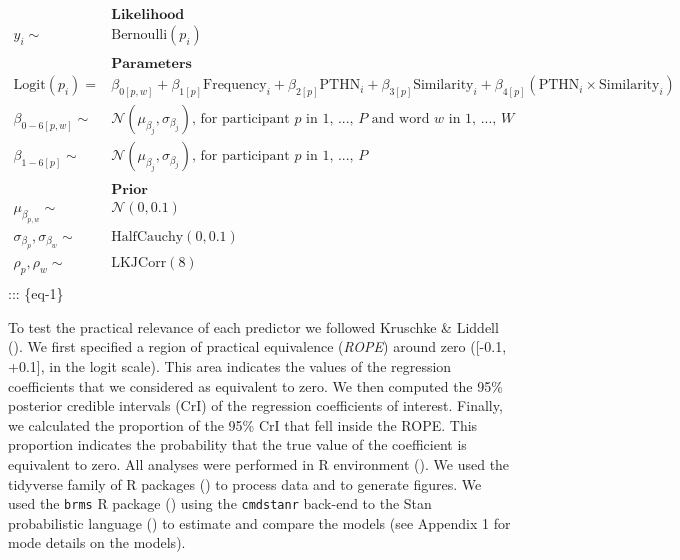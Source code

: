 \documentclass[
]{article}
\begin{document}
\[
\begin{aligned}
&\textbf{Likelihood}  \\
y_{i} \sim & \text{Bernoulli}(p_{i}) \\ \\
&\textbf{Parameters}  \\
\text{Logit}(p_{i}) = &  \beta_{0[p,w]} + \beta_{1[p]} \text{Frequency}_{i} + \beta_{2[p]} \text{PTHN}_i + \beta_{3[p]} \text{Similarity}_i + \beta_{4[p]} (\text{PTHN}_i \times \text{Similarity}_i) \\
\beta_{0-6[p,w]} \sim & \mathcal{N}(\mu_{\beta_{j}}, \sigma_{\beta_{j}}) \text{, for participant } p \text{ in 1, ..., } P \text{ and  word } w \text{ in 1, ..., } W \\
\beta_{1-6[p]} \sim &  \mathcal{N}(\mu_{\beta_{j}}, \sigma_{\beta_{j}}) \text{, for participant } p \text{ in 1, ..., } P \\ \\
&\textbf{Prior}  \\
\mu_{\beta_{p,w}}  \sim &  \mathcal{N}(0, 0.1) \\
\sigma_{\beta_{p}},  \sigma_{\beta_{w}} \sim & \text{HalfCauchy}(0, 0.1) \\
\rho_{p}, \rho_{w} \sim & \text{LKJCorr}(8) \\
\end{aligned}
\] ::: \{eq-1\}

To test the practical relevance of each predictor we followed Kruschke
\& Liddell (). We first
specified a region of practical equivalence (\emph{ROPE}) around zero
({[}-0.1, +0.1{]}, in the logit scale). This area indicates the values
of the regression coefficients that we considered as equivalent to zero.
We then computed the 95\% posterior credible intervals (CrI) of the
regression coefficients of interest. Finally, we calculated the
proportion of the 95\% CrI that fell inside the ROPE. This proportion
indicates the probability that the true value of the coefficient is
equivalent to zero. All analyses were performed in R environment
(). We used the
tidyverse family of R packages
() to process
data and to generate figures. We used the \texttt{brms} R package
() using the
\texttt{cmdstanr} back-end to the Stan probabilistic language
() to estimate
and compare the models (see Appendix 1 for mode details on the models).
\end{document}
